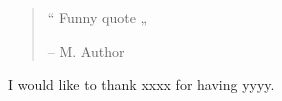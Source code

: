 
\begin{quote}
    “ Funny quote „

    -- M. Author
\end{quote}
I would like to thank xxxx for having yyyy.


